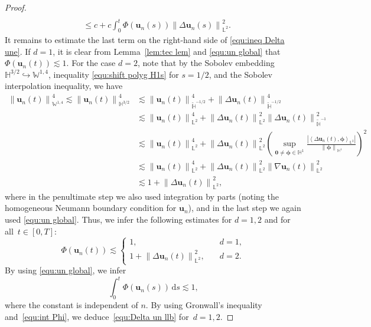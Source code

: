 \documentclass[11pt,reqno]{amsart}
\theoremstyle{definition}
\numberwithin{equation}{section}
\newcommand{\bff}{\boldsymbol}
\newcommand{\bb}{\mathbb}
\newcommand{\leqs}{\lesssim}
\newcommand{\ds}{\mathrm{d}s}
\newcommand{\nn}{\nonumber}
\newcommand{\norm}[2]{\left\|{#1}\right\|_{#2}}
\newcommand{\inpro}[2]{\left\langle#1,#2\right\rangle}
\newcommand{\abs}[1]{\left|{#1}\right|}
\begin{document}
\begin{proof}
\begin{align}
    \nn\\
    &\leq
    c + c\int_0^t
	\Phi(\bff{u}_n(s))
	\norm{\Delta\bff{u}_n(s)}{\bb{L}^2}^2.
\end{align}
It remains to estimate the last term on the right-hand side of \eqref{equ:ineq Delta une}. If $d=1$, it is clear from Lemma~\ref{lem:tec lem} and \eqref{equ:un global} that $\Phi(\bff{u}_n(t)) \lesssim 1$.
	For the case $d=2$, note that by the Sobolev embedding $\bb{H}^{3/2}\hookrightarrow \bb{W}^{1,4}$, inequality \eqref{equ:shift polyg H1s} for $s=1/2$, and the Sobolev interpolation inequality, we have
	\begin{align*}
		\norm{\bff{u}_n(t)}{\bb{W}^{1,4}}^4
		\leqs
		\norm{\bff{u}_n(t)}{\bb{H}^{3/2}}^4
		&\leqs
		\norm{\bff{u}_n(t)}{\widetilde{\bb{H}}^{-1/2}}^4
		+
		\norm{\Delta \bff{u}_n(t)}{\widetilde{\bb{H}}^{-1/2}}^4
		\\
		&\leqs
		\norm{\bff{u}_n(t)}{\bb{L}^2}^4
		+
		\norm{\Delta \bff{u}_n(t)}{\bb{L}^2}^2
		\norm{\Delta \bff{u}_n(t)}{\widetilde{\bb{H}}^{-1}}^2
		\\
		&\leqs
		\norm{\bff{u}_n(t)}{\bb{L}^2}^4
		+
		\norm{\Delta \bff{u}_n(t)}{\bb{L}^2}^2
		\left( \sup_{\bff{0}\neq \bff{\phi}\in \bb{H}^1} \frac{\abs{\inpro{\Delta \bff{u}_n(t)}{\bff{\phi}}_{\bb{L}^2}}}{\norm{\bff{\phi}}{\bb{H}^1}} \right)^2
		\\
		&\leqs
		\norm{\bff{u}_n(t)}{\bb{L}^2}^4
		+
		\norm{\Delta \bff{u}_n(t)}{\bb{L}^2}^2
		\norm{\nabla \bff{u}_n(t)}{\bb{L}^2}^2
		\\
		&\leqs
		1+ \norm{\Delta \bff{u}_n(t)}{\bb{L}^2}^2,
	\end{align*}
	where in the penultimate step we also used integration by parts (noting the homogeneous Neumann boundary condition for $\bff{u}_n$), and in the last step we again used \eqref{equ:un global}.
	Thus, we infer the following estimates for
	$d=1,2$ and for all~$t\in[0,T]$:
	\begin{equation}\label{equ:Phi un less}
	\Phi(\bff{u}_n(t))
	\lesssim
	\begin{cases}
		1, \quad & d=1,
		\\
		1 + \norm{\Delta\bff{u}_n(t)}{\bb{L}^2}^2,
		\quad & d=2.
	\end{cases}
	\end{equation}
	By using
	\eqref{equ:un global}, we infer
	\begin{equation}\label{equ:int Phi}
		\int_0^t
		\Phi(\bff{u}_n(s)) \,\ds \lesssim 1,
	\end{equation}
	where the constant is independent of $n$.
	By using Gronwall's inequality and~\eqref{equ:int Phi}, we deduce~\eqref{equ:Delta un llb} for~$d=1,2$.
	

\end{proof}
\end{document}
